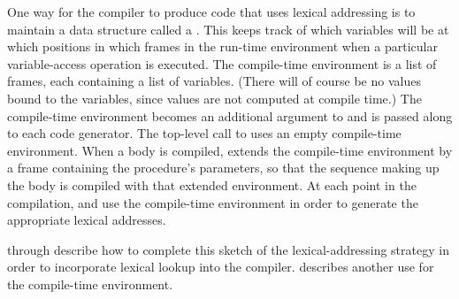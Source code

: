 \noindent
One way for the compiler to produce code that uses lexical addressing is to
maintain a data structure called a .  This
keeps track of which variables will be at which positions in which frames in
the run-time environment when a particular variable-access operation is
executed.  The compile-time environment is a list of frames, each containing a
list of variables.  (There will of course be no values bound to the variables,
since values are not computed at compile time.)  The compile-time environment
becomes an additional argument to  and is passed along to each
code generator.  The top-level call to  uses an empty
compile-time environment.  When a  body is compiled,
 extends the compile-time environment by a frame
containing the procedure's parameters, so that the sequence making up the body
is compiled with that extended environment.  At each point in the compilation,
 and  use the compile-time
environment in order to generate the appropriate lexical addresses.

 through  describe how to complete this
sketch of the lexical-addressing strategy in order to incorporate lexical
lookup into the compiler.   describes another use for the
compile-time environment.

